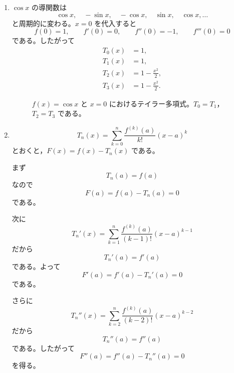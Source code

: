 \documentclass[a4paper,12pt]{jsarticle}
\theoremstyle{definition}
\begin{document}
\begin{enumerate}
\item $\cos x$ の導関数は
\[
\cos x,\quad -\sin x,\quad -\cos x,\quad \sin x,\quad \cos x,\dots
\]
と周期的に変わる。$x=0$ を代入すると
\[
f(0)=1,\qquad f'(0)=0,\qquad f''(0)=-1,\qquad f'''(0)=0
\]
である。したがって
\[
\begin{aligned}
T_0(x)&=1,\\
T_1(x)&=1,\\
T_2(x)&=1-\frac{x^2}{2},\\
T_3(x)&=1-\frac{x^2}{2}.
\end{aligned}
\]

\begin{figure}[H]
\centering
{}
\caption{$f(x)=\cos x$ と $x=0$ におけるテイラー多項式。$T_0=T_1$，$T_2=T_3$ である。}
\end{figure}

\item
\[
T_n(x)=\sum_{k=0}^{n}\frac{f^{(k)}(a)}{k!}(x-a)^k
\]
とおくと，$F(x)=f(x)-T_n(x)$ である。

まず
\[
T_n(a)=f(a)
\]
なので
\[
F(a)=f(a)-T_n(a)=0
\]
である。

次に
\[
T_n'(x)=\sum_{k=1}^{n}\frac{f^{(k)}(a)}{(k-1)!}(x-a)^{k-1}
\]
だから
\[
T_n'(a)=f'(a)
\]
である。よって
\[
F'(a)=f'(a)-T_n'(a)=0
\]
である。

さらに
\[
T_n''(x)=\sum_{k=2}^{n}\frac{f^{(k)}(a)}{(k-2)!}(x-a)^{k-2}
\]
だから
\[
T_n''(a)=f''(a)
\]
である。したがって
\[
F''(a)=f''(a)-T_n''(a)=0
\]
を得る。
\end{enumerate}
\end{document}
